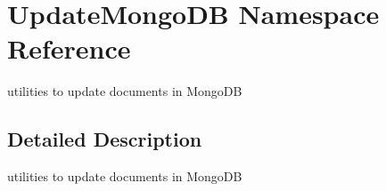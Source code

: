 \hypertarget{namespaceUpdateMongoDB}{}\section{Update\+Mongo\+DB Namespace Reference}
\label{namespaceUpdateMongoDB}


utilities to update documents in Mongo\+DB  




\subsection{Detailed Description}
utilities to update documents in Mongo\+DB 